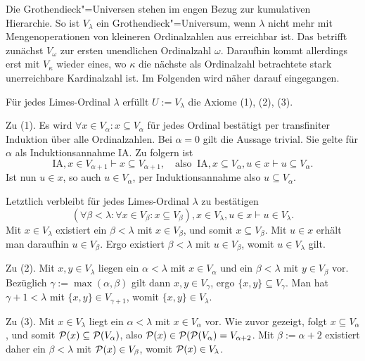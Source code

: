 \noindent
Die Grothendieck"=Universen stehen im engen Bezug zur kumulativen
Hierarchie. So ist $V_\lambda$ ein Grothendieck"=Universum, wenn
$\lambda$ nicht mehr mit Mengenoperationen von kleineren Ordinalzahlen
aus erreichbar ist. Das betrifft zunächst $V_\omega$ zur ersten unendlichen
Ordinalzahl $\omega$. Daraufhin kommt allerdings erst mit $V_\kappa$
wieder eines, wo $\kappa$ die nächste als Ordinalzahl betrachtete stark
unerreichbare Kardinalzahl ist. Im Folgenden wird näher darauf
eingegangen.

\begin{Satz}
Für jedes Limes-Ordinal $\lambda$ erfüllt $U:=V_\lambda$
die Axiome (1), (2), (3).
\end{Satz}
\begin{Beweis}
Zu (1). Es wird $\forall x\in V_\alpha\colon x\subseteq V_\alpha$ für jedes
Ordinal bestätigt per transfiniter Induktion über alle Ordinalzahlen.
Bei $\alpha=0$ gilt die Aussage trivial. Sie gelte für $\alpha$ als
Induktionsannahme IA. Zu folgern ist
\[\text{IA}, x\in V_{\alpha+1}\vdash x\subseteq V_{\alpha+1},\quad
\text{also}\;\;
\text{IA}, x\subseteq V_\alpha, u\in x\vdash u\subseteq V_\alpha.\]
Ist nun $u\in x$, so auch $u\in V_\alpha$, per Induktionsannahme
also $u\subseteq V_\alpha$.

Letztlich verbleibt für jedes Limes-Ordinal $\lambda$ zu bestätigen
\[(\forall \beta<\lambda\colon \forall x\in V_\beta\colon x\subseteq V_\beta),
x\in V_\lambda, u\in x\vdash u\in V_\lambda.\]
Mit $x\in V_\lambda$ existiert ein $\beta<\lambda$ mit $x\in V_\beta$,
und somit $x\subseteq V_\beta$. Mit $u\in x$ erhält man daraufhin
$u\in V_\beta$. Ergo existiert $\beta<\lambda$ mit $u\in V_\beta$,
womit $u\in V_\lambda$ gilt.

Zu (2). Mit $x,y\in V_\lambda$ liegen ein $\alpha<\lambda$ mit
$x\in V_\alpha$ und ein $\beta<\lambda$ mit $y\in V_\beta$ vor. Bezüglich
$\gamma:=\max(\alpha,\beta)$ gilt dann $x,y\in V_\gamma$,
ergo $\{x,y\}\subseteq V_\gamma$. Man hat $\gamma+1<\lambda$ mit
$\{x,y\}\in V_{\gamma+1}$, womit $\{x,y\}\in V_\lambda$.

Zu (3). Mit $x\in V_\lambda$ liegt ein $\alpha<\lambda$ mit $x\in V_\alpha$ vor.
Wie zuvor gezeigt, folgt $x\subseteq V_\alpha$, und somit
$\mathcal P(x)\subseteq\mathcal P(V_\alpha)$, also $\mathcal P(x)\in
\mathcal P(\mathcal P(V_\alpha)=V_{\alpha+2}$. Mit $\beta:=\alpha+2$ existiert
daher ein $\beta<\lambda$ mit $\mathcal P(x)\in V_\beta$, womit
$\mathcal P(x)\in V_\lambda$.\,\qedsymbol
\end{Beweis}
